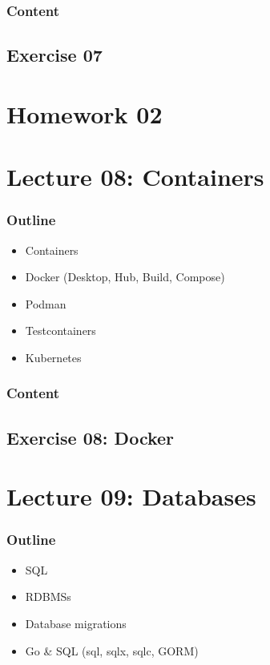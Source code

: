 \documentclass[
  digital,
  color,
  oneside,
  nosansbold,
  nocolorbold,
  lof,
  nolot,
]{fithesis4}
\begin{document}
\subsubsection{Content}

\subsection{Exercise 07}

\section{Homework 02}

\section{Lecture 08: Containers}\label{lecture-containers}

\subsubsection{Outline}

\begin{itemize}
    \item Containers
    \item Docker (Desktop, Hub, Build, Compose)
    \item Podman
    \item Testcontainers
    \item Kubernetes
\end{itemize}

\subsubsection{Content}

\subsection{Exercise 08: Docker}

\section{Lecture 09: Databases}\label{lecture-databases}

\subsubsection{Outline}

\begin{itemize}
    \item SQL
    \item RDBMSs
    \item Database migrations
    \item Go \& SQL (sql, sqlx, sqlc, GORM)
\end{itemize}
\end{document}
